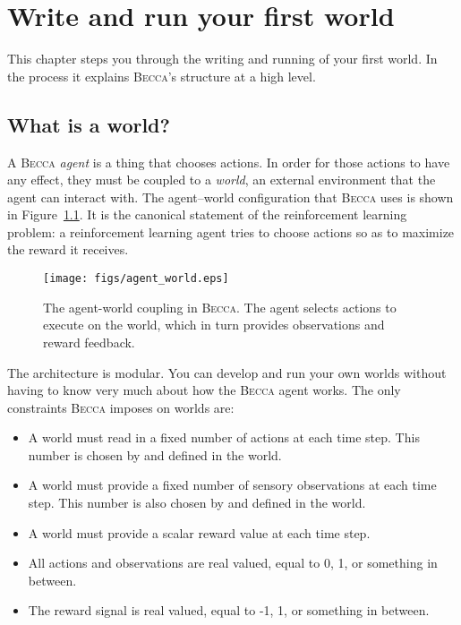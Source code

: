 \chapter{Write and run your first world}

This chapter steps you through the writing and running of your first world. In the process it explains \textsc{Becca}'s structure at a high level.

\section{What is a world?}

A \textsc{Becca} {\em agent} is a thing that chooses actions. In order for those actions to have any effect, they must be coupled to a {\em world}, an external environment that the agent can interact with. The agent--world configuration that \textsc{Becca} uses is shown in Figure~\ref{agent_world}. It is the canonical statement of the reinforcement learning problem: a reinforcement learning agent tries to choose actions so as to maximize the reward it receives.~\cite{sutton98} 

\begin{figure}
\centering
\texttt{[image: figs/agent\_world.eps]}
\caption{The agent-world coupling in \textsc{Becca}. The agent selects actions to execute on the world, which in turn provides observations and reward feedback.}
\label{agent_world}
\end{figure}

The architecture is modular. You can develop and run your own worlds without having to know very much about how the \textsc{Becca} agent works. The only constraints \textsc{Becca} imposes on worlds are:

\begin{itemize}
\item{A world must read in a fixed number of actions at each time step. This number is chosen by and defined in the world.}
\item{A world must provide a fixed number of sensory observations at each time step. This number is also chosen by and defined in the world.}
\item{A world must provide a scalar reward value at each time step.}
\item{All actions and observations are real valued, equal to 0, 1, or something in between.}
\item{The reward signal is real valued, equal to -1, 1, or something in between.}
\end{itemize}

